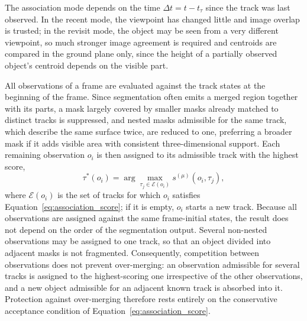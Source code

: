 {The association mode depends on the time $\Delta t = t - t_{\tau}$ since the track was last observed. In the recent mode, the viewpoint has changed little and image overlap is trusted; in the revisit mode, the object may be seen from a very different viewpoint, so much stronger image agreement is required and centroids are compared in the ground plane only, since the height of a partially observed object's centroid depends on the visible part.

All observations of a frame are evaluated against the track states at the beginning of the frame. Since segmentation often emits a merged region together with its parts, a mask largely covered by smaller masks already matched to distinct tracks is suppressed, and nested masks admissible for the same track, which describe the same surface twice, are reduced to one, preferring a broader mask if it adds visible area with consistent three-dimensional support. Each remaining observation $o_i$ is then assigned to its admissible track with the highest score,
\begin{equation}
	\tau^{*}(o_i) = \arg\max_{\tau_j \in \mathcal{E}(o_i)} s^{(\mu)}(o_i, \tau_j),
	\label{eq:assignment}
\end{equation}
where $\mathcal{E}(o_i)$ is the set of tracks for which $o_i$ satisfies Equation~\ref{eq:association_score}; if it is empty, $o_i$ starts a new track. Because all observations are assigned against the same frame-initial states, the result does not depend on the order of the segmentation output. Several non-nested observations may be assigned to one track, so that an object divided into adjacent masks is not fragmented. Consequently, competition between observations does not prevent over-merging: an observation admissible for several tracks is assigned to the highest-scoring one irrespective of the other observations, and a new object admissible for an adjacent known track is absorbed into it. Protection against over-merging therefore rests entirely on the conservative acceptance condition of Equation~\ref{eq:association_score}.
\par}


